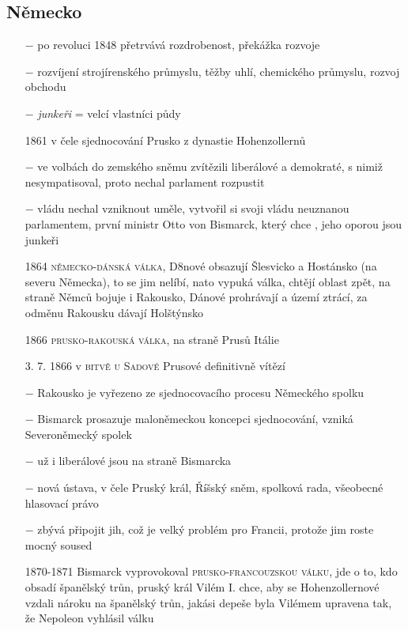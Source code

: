 \documentclass{article}
\begin{document}
\subsection*{Německo}
\begin{itemize}
    \vspace{-0.5em}
    \setlength\itemsep{0.15em}
    \item[$-$] po revoluci 1848 přetrvává rozdrobenost, překážka rozvoje
    \item[$-$] rozvíjení strojírenského průmyslu, těžby uhlí, chemického průmyslu, rozvoj obchodu
    \item[$-$] \textit{junkeři} = velcí vlastníci půdy
    \item[1861] v čele sjednocování Prusko z dynastie Hohenzollernů
    \item[$-$] ve volbách do zemského sněmu zvítězili liberálové a demokraté, s nimiž nesympatisoval, proto nechal parlament rozpustit
    \item[$-$] vládu nechal vzniknout uměle, vytvořil si svoji vládu neuznanou parlamentem, první ministr Otto von Bismarck, který chce , jeho oporou jsou junkeři
    \item[1864] \textsc{německo-dánská válka}, D8nové obsazují  Šlesvicko a Hostánsko (na severu Německa), to se jim nelíbí, nato vypuká válka, chtějí oblast zpět, na straně Němců bojuje i Rakousko, Dánové prohrávají a území ztrácí, za odměnu Rakousku dávají Holštýnsko
    \item[1866] \textsc{prusko-rakouská válka}, na straně Prusů Itálie
    \item[3. 7. 1866] v \textsc{bitvě u Sadové} Prusové definitivně vítězí
    \item[$-$] Rakousko je vyřezeno ze sjednocovacího procesu Německého spolku
    \item[$-$] Bismarck prosazuje maloněmeckou koncepci sjednocování, vzniká Severoněmecký spolek
    \item[$-$] už i liberálové jsou na straně Bismarcka
    \item[$-$] nová ústava, v čele Pruský král, Říšský sněm, spolková rada, všeobecné hlasovací právo
    \item[$-$] zbývá připojit jih, což je velký problém pro Francii, protože jim roste mocný soused
    \item[1870-1871] Bismarck vyprovokoval \textsc{prusko-francouzskou válku}, jde o to, kdo obsadí španělský trůn, pruský král Vilém I. chce, aby se Hohenzollernové vzdali nároku na španělský trůn, jakási depeše byla Vilémem upravena tak, že Nepoleon vyhlásil válku

\end{itemize}
\end{document}

